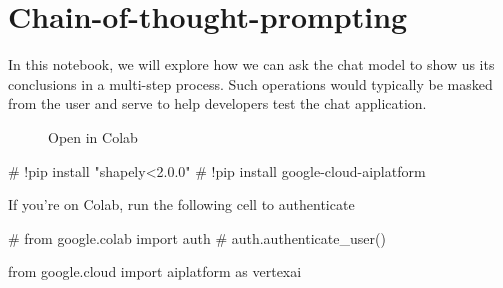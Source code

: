 \documentclass[
  letterpaper,
  DIV=11,
  numbers=noendperiod]{scrreprt}
\newenvironment{Shaded}{\begin{snugshade}}{\end{snugshade}}
\newcommand{\CommentTok}[1]{\textcolor[rgb]{0.37,0.37,0.37}{#1}}
\newcommand{\ImportTok}[1]{\textcolor[rgb]{0.00,0.46,0.62}{#1}}
\newcommand{\NormalTok}[1]{\textcolor[rgb]{0.00,0.23,0.31}{#1}}
\begin{document}

\hypertarget{chain-of-thought-prompting}{%
\chapter{Chain-of-thought-prompting}\label{chain-of-thought-prompting}}

In this notebook, we will explore how we can ask the chat model to show
us its conclusions in a multi-step process. Such operations would
typically be masked from the user and serve to help developers test the
chat application.

\begin{figure}

{\centering 

\href{https://colab.research.google.com/github/rastringer/building_apps_with_genai_studio/blob/main/2_chain_of_thought.ipynb}{}

}

\caption{Open in Colab}

\end{figure}

\begin{Shaded}
\begin{Highlighting}[]
\CommentTok{\# !pip install "shapely\textless{}2.0.0"}
\CommentTok{\# !pip install google{-}cloud{-}aiplatform}
\end{Highlighting}
\end{Shaded}

If you're on Colab, run the following cell to authenticate

\begin{Shaded}
\begin{Highlighting}[]
\CommentTok{\# from google.colab import auth}
\CommentTok{\# auth.authenticate\_user()}
\end{Highlighting}
\end{Shaded}

\begin{Shaded}
\begin{Highlighting}[]
\ImportTok{from}\NormalTok{ google.cloud }\ImportTok{import}\NormalTok{ aiplatform }\ImportTok{as}\NormalTok{ vertexai}
\end{Highlighting}
\end{Shaded}
\end{document}
